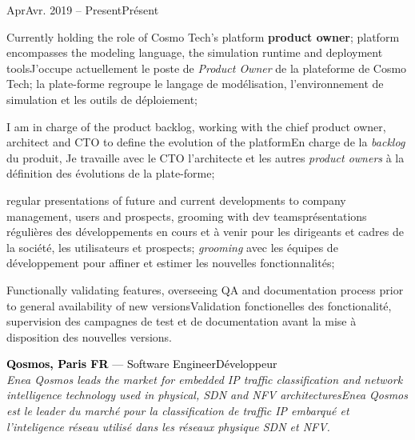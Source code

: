 \documentclass[a4paper]{article}
\newcommand\enfr[2]{\ifdefined\doen#1\else#2\fi\xspace}
\newcommand\entry[2]{\large\textcolor{Black}{\textbf{#1} --- #2}\normalsize}
\newcommand\timespan[2]{\normalsize\textsf{#1 -- #2}}
\begin{document}
\begin{minipage}[t]{0.63\textwidth}
\vspace{0.5em}
\timespan{\enfr{Apr}{Avr}. 2019}{\enfr{Present}{Présent}}
\begin{compactitem}
\item[\textbullet] \enfr{Currently holding the role of Cosmo Tech's platform \textbf{product
  owner}; platform encompasses the modeling language, the
    simulation runtime and deployment tools}
  {J'occupe actuellement le poste de \textit{Product Owner} de la plateforme de Cosmo Tech; la plate-forme regroupe le langage de modélisation, l’environnement de simulation et les outils de déploiement};
\item[\textbullet] \enfr{I am in charge of the product backlog, working with
  the chief product owner, architect and CTO to define the evolution
  of the platform}
  {En charge de la \textit{backlog} du
  produit, Je travaille avec le CTO l'architecte et les autres
  \textit{product owners} à la définition des évolutions de la
  plate-forme};
\item[\textbullet] \enfr{regular presentations of future and current
  developments to company management, users and prospects, grooming
  with dev teams}
  {présentations régulières des développements en
  cours et à venir pour les dirigeants et cadres de la société, les
  utilisateurs et prospects; \textit{grooming} avec les équipes de
  développement pour affiner et estimer les nouvelles fonctionnalités};
\item[\textbullet] \enfr{Functionally validating features, overseeing QA and
  documentation process prior to general availability of new versions}
  {Validation fonctionelles des fonctionalité, supervision des
    campagnes de test et de documentation avant la mise à disposition
    des nouvelles versions}.\\
\end{compactitem}

\entry{Qosmos, Paris\enfr{ FR}{}}{\enfr{Software Engineer}{Développeur}}\\
\textit{\enfr{Enea Qosmos leads the market for embedded IP traffic
    classification and network intelligence technology used in
    physical, SDN and NFV architectures}
  {Enea Qosmos est le leader du marché pour la classification de
    traffic IP embarqué et l'inteligence réseau utilisé dans les
    réseaux physique SDN et NFV}.}


\end{minipage}
\end{document}
